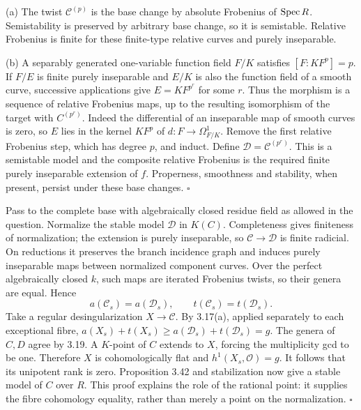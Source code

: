 \documentclass[11pt]{article}
\let\chapterexercise\exercise
\renewcommand{\exercise}[2]{\Needspace{8\baselineskip}\chapterexercise{#1}{#2}}
\begin{document}
\pf (a) The twist $\mathcal C^{(p)}$ is the base change by absolute Frobenius of $\operatorname{Spec} R$. Semistability is preserved by arbitrary base change, so it is semistable. Relative Frobenius is finite for these finite-type relative curves and purely inseparable.

(b) A separably generated one-variable function field $F/K$ satisfies $[F:KF^p]=p$. If $F/E$ is finite purely inseparable and $E/K$ is also the function field of a smooth curve, successive applications give $E=KF^{p^r}$ for some $r$. Thus the morphism is a sequence of relative Frobenius maps, up to the resulting isomorphism of the target with $C^{(p^r)}$. Indeed the differential of an inseparable map of smooth curves is zero, so $E$ lies in the kernel $KF^p$ of $d:F\to\Omega^1_{F/K}$. Remove the first relative Frobenius step, which has degree $p$, and induct. Define $\mathcal D=\mathcal C^{(p^r)}$. This is a semistable model and the composite relative Frobenius is the required finite purely inseparable extension of $f$. Properness, smoothness and stability, when present, persist under these base changes. \hfill$\square$

\pf Pass to the complete base with algebraically closed residue field as allowed in the question. Normalize the stable model $\mathcal D$ in $K(C)$. Completeness gives finiteness of normalization; the extension is purely inseparable, so $\mathcal C\to\mathcal D$ is finite radicial. On reductions it preserves the branch incidence graph and induces purely inseparable maps between normalized component curves. Over the perfect algebraically closed $k$, such maps are iterated Frobenius twists, so their genera are equal. Hence
\[ a(\mathcal C_s)=a(\mathcal D_s),\qquad
 t(\mathcal C_s)=t(\mathcal D_s). \]
Take a regular desingularization $X\to\mathcal C$. By 3.17(a), applied separately to each exceptional fibre, $a(X_s)+t(X_s)\ge a(\mathcal D_s)+t(\mathcal D_s)=g$. The genera of $C,D$ agree by 3.19. A $K$-point of $C$ extends to $X$, forcing the multiplicity gcd to be one. Therefore $X$ is cohomologically flat and $h^1(X_s,\mathcal O)=g$. It follows that its unipotent rank is zero. Proposition 3.42 and stabilization now give a stable model of $C$ over $R$. This proof explains the role of the rational point: it supplies the fibre cohomology equality, rather than merely a point on the normalization. \hfill$\square$
\end{document}
